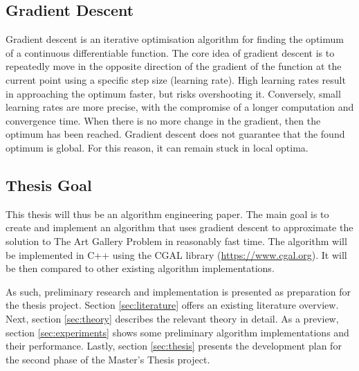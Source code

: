 \newpage
\subsection{Gradient Descent}

Gradient descent is an iterative optimisation algorithm for finding the optimum of a continuous differentiable function. The core idea of gradient descent is to repeatedly move in the opposite direction of the gradient of the function at the current point using a specific step size (learning rate). High learning rates result in approaching the optimum faster, but risks overshooting it. Conversely, small learning rates are more precise, with the compromise of a longer computation and convergence time.
When there is no more change in the gradient, then the optimum has been reached. Gradient descent does not guarantee that the found optimum is global. For this reason, it can remain stuck in local optima.

\subsection{Thesis Goal}

This thesis will thus be an algorithm engineering paper. The main goal is to create and implement an algorithm that uses gradient descent to approximate the solution to The Art Gallery Problem \cite{o1987art} in reasonably fast time. The algorithm will be implemented in C++ using the CGAL library (\url{https://www.cgal.org}). It will be then compared to other existing algorithm implementations.

As such, preliminary research and implementation is presented as preparation for the thesis project. Section \ref{sec:literature} offers an existing literature overview. Next, section \ref{sec:theory} describes the relevant theory in detail.
As a preview, section \ref{sec:experiments} shows some preliminary algorithm implementations and their performance.
Lastly, section \ref{sec:thesis} presents the development plan for the second phase of the Master's Thesis project.